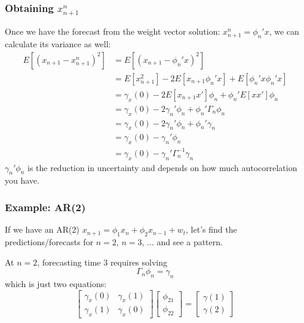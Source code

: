 \documentclass[%
xcolor=pdftex]{beamer}
\begin{document}
\begin{frame}
\frametitle{Obtaining $x_{n+1}^n$ }

Once we have the forecast from the weight vector solution: $x_{n+1}^n = \phi_n' x$, we can calculate its variance as well:
\begin{align*}
E[(x_{n+1} - x_{n+1}^n)^2] &= E[(x_{n+1} - \phi_n' x)^2] \\
&= E[x_{n+1}^2] - 2 E[x_{n+1}\phi_n' x] + E[\phi_n' x \phi_n' x] \\
&= \gamma_x(0)- 2 E[x_{n+1} x']\phi_n + \phi_n' E[x x']\phi_n\\
&= \gamma_x(0)- 2 \gamma_n' \phi_n + \phi_n' \Gamma_n \phi_n\\
&= \gamma_x(0)- 2 \gamma_n' \phi_n + \phi_n' \gamma_n \\
&= \gamma_x(0)-  \gamma_n' \phi_n  \\
&= \gamma_x(0)-  \gamma_n' \Gamma_n^{-1}\gamma_n  
\end{align*}
$\gamma_n' \phi_n$ is the reduction in uncertainty and depends on how much autocorrelation you have.

\end{frame}

\begin{frame}
\frametitle{Example: AR(2)}

If we have an AR(2) $x_{n+1} = \phi_1 x_{n} + \phi_2 x_{n-1} + w_t$, let's find the predictions/forecasts for $n=2$, $n=3$, ... and see a pattern.
\newline

At $n=2$, forecasting time $3$ requires solving
$$
\Gamma_n \phi_n = \gamma_n
$$
which is just two equations:
$$
\begin{bmatrix}
\gamma_x(0) & \gamma_x(1) \\
\gamma_x(1) & \gamma_x(0)
\end{bmatrix}
\begin{bmatrix}
\phi_{21} \\
\phi_{22}
\end{bmatrix}
=
\begin{bmatrix}
\gamma(1) \\
\gamma(2)
\end{bmatrix}
$$

 
\end{frame}
\end{document}
